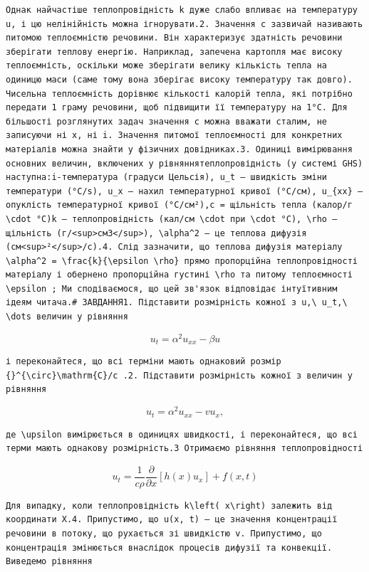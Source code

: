 \documentclass[
  ukrainian,
]{article}
\begin{document}
\begin{verbatim}
Однак найчастіше теплопровідність k дуже слабо впливає на температуру u, і цю нелінійність можна ігнорувати.2. Значення c зазвичай називають питомою теплоємністю речовини. Він характеризує здатність речовини зберігати теплову енергію. Наприклад, запечена картопля має високу теплоємність, оскільки може зберігати велику кількість тепла на одиницю маси (саме тому вона зберігає високу температуру так довго). Чисельна теплоємність дорівнює кількості калорій тепла, які потрібно передати 1 граму речовини, щоб підвищити її температуру на 1°C. Для більшості розглянутих задач значення c можна вважати сталим, не записуючи ні x, ні i. Значення питомої теплоємності для конкретних матеріалів можна знайти у фізичних довідниках.3. Одиниці вимірювання основних величин, включених у рівняннятеплопровідність (у системі GHS) наступна:i-температура (градуси Цельсія), u_t — швидкість зміни температури (°C/s), u_x — нахил температурної кривої (°C/см), u_{xx} — опуклість температурної кривої (°C/см²),c = щільність тепла (калор/г \cdot °C)k — теплопровідність (кал/см \cdot при \cdot °C), \rho — щільність (г/<sup>см3</sup>), \alpha^2 — це теплова дифузія (см<sup>²</sup>/с).4. Слід зазначити, що теплова дифузія матеріалу \alpha^2 = \frac{k}{\epsilon \rho} прямо пропорційна теплопровідності матеріалу і обернено пропорційна густині \rho та питому теплоємності \epsilon ; Ми сподіваємося, що цей зв'язок відповідає інтуїтивним ідеям читача.# ЗАВДАННЯ1. Підставити розмірність кожної з u,\ u_t,\ \dots величин у рівняння
\end{verbatim}

\[
u_t = \alpha^2 u_{xx} - \beta u
\]

\begin{verbatim}
і переконайтеся, що всі терміни мають однаковий розмір {}^{\circ}\mathrm{C}/c .2. Підставити розмірність кожної з величин у рівняння
\end{verbatim}

\[
u_t = \alpha^2 u_{xx} - v u_x,
\]

\begin{verbatim}
де \upsilon вимірюється в одиницях швидкості, і переконайтеся, що всі терми мають однакову розмірність.3 Отримаємо рівняння теплопровідності
\end{verbatim}

\[
u_{t} = \frac{1}{c\rho} \frac{\partial}{\partial x} [h(x) u_{x}] + f(x, t)
\]

\begin{verbatim}
Для випадку, коли теплопровідність k\left( x\right) залежить від координати X.4. Припустимо, що u(x, t) — це значення концентрації речовини в потоку, що рухається зі швидкістю v. Припустимо, що концентрація змінюється внаслідок процесів дифузії та конвекції. Виведемо рівняння
\end{verbatim}
\end{document}
